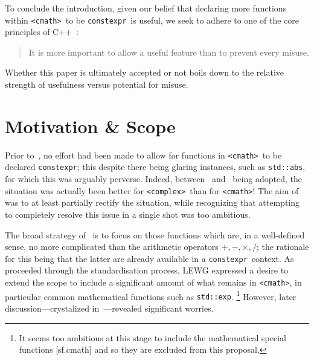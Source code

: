 \documentclass[prd,twocolumn,amsmath,amssymb,nofootinbib,eqsecnum]{revtex4-1}
\newcommand{\constexpr}{\code{constexpr}\xspace}
\newcommand{\code}[1]{{\tt #1}}
\newcommand{\header}[1]{{\tt <#1>}}
\newcommand{\cmath}{\header{cmath}}
\newcommand{\complex}{\header{complex}}
\newcommand{\Operators}{\ensuremath{+,-,\times,/}}
\begin{document}
To conclude the introduction, given our belief that declaring more functions within \cmath\ to be \constexpr\ is useful, we seek to adhere to one of the core principles of C++~\cite{DandE}:
\begin{quote}
	It is more important to allow a useful feature than to prevent every misuse.
\end{quote}
Whether this paper is ultimately accepted or not boils down to the relative strength of usefulness versus potential for misuse.

\section{Motivation \& Scope}
\label{sec:Motivation}

Prior to~\cite{Rosten-constexpr}, no effort had been made to allow for functions in \cmath\ to be declared \constexpr; this despite there being glaring instances, such as \code{std::abs}, for which this was arguably perverse. Indeed, between~\cite{AP-complex} and~\cite{Rosten-constexpr} being adopted, the situation was actually been better for \complex\ than for \cmath! The aim of~\cite{Rosten-constexpr} was to at least partially rectify the situation, while recognizing that attempting to completely resolve this issue in a single shot was too ambitious.

The broad strategy of~\cite{Rosten-constexpr} is to focus on those functions which are, in a well-defined sense, no more complicated than the arithmetic operators \Operators; the rationale for this being that the latter are already available in a \constexpr\ context.
As~\cite{Rosten-constexpr} proceeded through the standardisation process, LEWG expressed a desire 
to extend the scope to include a significant amount of what remains in \cmath, in particular common mathematical functions such as \code{std::exp}.%
\footnote{It seems too ambitious at this stage to include the mathematical special functions [sf.cmath] and so they are excluded from this proposal.}
However, later discussion---crystalized in~\cite{Timmons-Less}---revealed significant worries.
\end{document}
